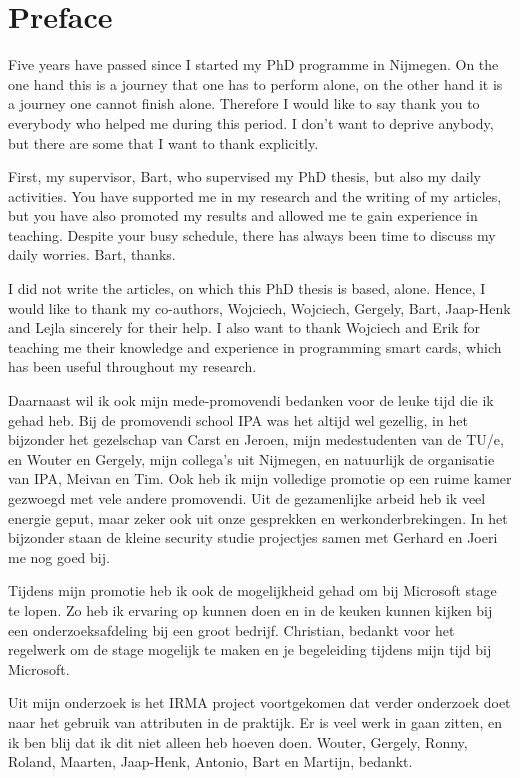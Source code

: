 \chapter*{Preface}

Five years have passed since I started my PhD programme in Nijmegen. On the one
hand this is a journey that one has to perform alone, on the other hand it is a
journey one cannot finish alone. Therefore I would like to say thank you to 
everybody who helped me during this period. I don't want to deprive anybody, 
but there are some that I want to thank explicitly.

First, my supervisor, Bart, who supervised my PhD thesis, but also my daily
activities. You have supported me in my research and the writing of my articles,
but you have also promoted my results and allowed me te gain experience in 
teaching. Despite your busy schedule, there has always been time to discuss my 
daily worries. Bart, thanks.

I did not write the articles, on which this PhD thesis is based, alone. Hence,
I would like to thank my co-authors, Wojciech, Wojciech, Gergely, Bart, 
Jaap-Henk and Lejla sincerely for their help. I also want to thank Wojciech and
Erik for teaching me their knowledge and experience in programming smart cards,
which has been useful throughout my research.

Daarnaast wil ik ook mijn mede-promovendi bedanken voor de leuke tijd die ik 
gehad heb. Bij de promovendi school IPA was het altijd wel gezellig, in het 
bijzonder het gezelschap van Carst en Jeroen, mijn medestudenten van de TU/e,
en Wouter en Gergely, mijn collega's uit Nijmegen, en natuurlijk de organisatie
van IPA, Meivan en Tim. Ook heb ik mijn volledige promotie op een ruime kamer
gezwoegd met vele andere promovendi. Uit de gezamenlijke arbeid heb ik veel 
energie geput, maar zeker ook uit onze gesprekken en werkonderbrekingen. In het
bijzonder staan de kleine security studie projectjes samen met Gerhard en Joeri
me nog goed bij.

Tijdens mijn promotie heb ik ook de mogelijkheid gehad om bij Microsoft stage 
te lopen. Zo heb ik ervaring op kunnen doen en in de keuken kunnen kijken bij 
een onderzoeksafdeling bij een groot bedrijf. Christian, bedankt voor het
regelwerk om de stage mogelijk te maken en je begeleiding tijdens mijn tijd bij
Microsoft.

Uit mijn onderzoek is het IRMA project voortgekomen dat verder onderzoek doet
naar het gebruik van attributen in de praktijk. Er is veel werk in gaan zitten,
en ik ben blij dat ik dit niet alleen heb hoeven doen. Wouter, Gergely, Ronny,
Roland, Maarten, Jaap-Henk, Antonio, Bart en Martijn, bedankt.

